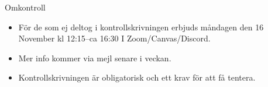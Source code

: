 \begin{Slide}{Omkontroll}
  \begin{itemize}
    \item För de som ej deltog i kontrollskrivningen erbjuds  måndagen den 16 November kl 12:15--ca 16:30 I Zoom/Canvas/Discord.
    \item Mer info kommer via mejl senare i veckan.
    \item Kontrollskrivningen är obligatorisk och ett krav för att få tentera.
  \end{itemize}  
\end{Slide}
